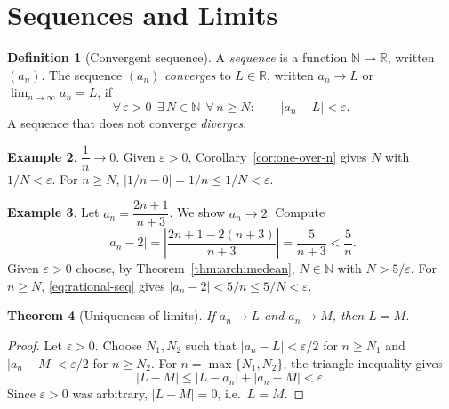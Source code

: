 \documentclass[11pt,a4paper]{book}
\newcommand{\N}{\mathbb{N}}
\newcommand{\R}{\mathbb{R}}
\newcommand{\abs}[1]{\left|#1\right|}
\numberwithin{equation}{section}          %
\theoremstyle{plain}
\newtheorem{theorem}{Theorem}[section]    %
\theoremstyle{definition}
\newtheorem{definition}[theorem]{Definition}
\newtheorem{example}[theorem]{Example}
\theoremstyle{remark}
\begin{document}
\section{Sequences and Limits}\label{sec:sequences}

\begin{definition}[Convergent sequence]\label{def:limit}
A \emph{sequence} is a function $\N\to\R$, written $(a_n)$. The sequence $(a_n)$ \emph{converges} to $L\in\R$, written $a_n\to L$ or $\lim_{n\to\infty}a_n=L$, if
\begin{equation}\label{eq:limit}
    \forall\,\varepsilon>0\ \ \exists\,N\in\N\ \ \forall\,n\ge N:\qquad \abs{a_n-L}<\varepsilon .
\end{equation}
A sequence that does not converge \emph{diverges}.
\end{definition}

\begin{example}\label{ex:one-over-n}
$\dfrac1n\to0$. Given $\varepsilon>0$, Corollary~\ref{cor:one-over-n} gives $N$ with $1/N<\varepsilon$. For $n\ge N$, $\abs{1/n-0}=1/n\le 1/N<\varepsilon$.
\end{example}

\begin{example}\label{ex:rational-seq}
Let $a_n=\dfrac{2n+1}{n+3}$. We show $a_n\to2$. Compute
\begin{equation}\label{eq:rational-seq}
    \abs{a_n-2}=\abs{\frac{2n+1-2(n+3)}{n+3}}=\frac{5}{n+3}<\frac5n .
\end{equation}
Given $\varepsilon>0$ choose, by Theorem~\ref{thm:archimedean}, $N\in\N$ with $N>5/\varepsilon$. For $n\ge N$, \eqref{eq:rational-seq} gives $\abs{a_n-2}<5/n\le5/N<\varepsilon$.
\end{example}

\begin{theorem}[Uniqueness of limits]\label{thm:unique}
If $a_n\to L$ and $a_n\to M$, then $L=M$.
\end{theorem}

\begin{proof}
Let $\varepsilon>0$. Choose $N_1,N_2$ such that $\abs{a_n-L}<\varepsilon/2$ for $n\ge N_1$ and $\abs{a_n-M}<\varepsilon/2$ for $n\ge N_2$. For $n=\max\{N_1,N_2\}$, the triangle inequality gives
\[
    \abs{L-M}\le\abs{L-a_n}+\abs{a_n-M}<\varepsilon .
\]
Since $\varepsilon>0$ was arbitrary, $\abs{L-M}=0$, i.e.\ $L=M$.
\end{proof}
\end{document}
